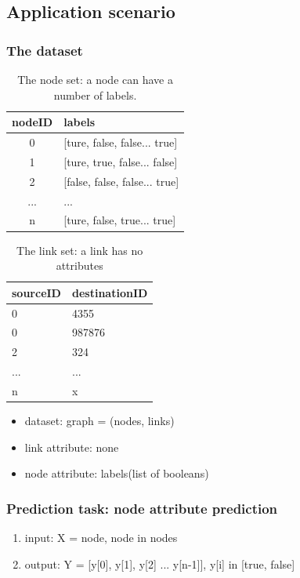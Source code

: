 \documentclass{article}
\begin{document}
\subsection{Application scenario}

\subsubsection{The dataset}
\begin{table}[H]
	\centering
	\begin{tabularx}{0.5\textwidth}{|c|X| }  \hline
		nodeID & labels \\ \hline
		0 & [ture, false, false... true] \\ \hline
		1 & [ture, true, false... false] \\ \hline
		2 & [false, false, false... true] \\ \hline
		... & ... \\ \hline
		n & [ture, false, true... true] \\ \hline
	\end{tabularx}
	\caption{The node set: a node can have a number of labels.}
\end{table}
\begin{table}[H]
	\centering
	\begin{tabularx}{0.5\textwidth}{|X|X|}  \hline
		sourceID & destinationID \\ \hline
		0 & 4355 \\ \hline
		0 & 987876 \\ \hline
		2 & 324 \\ \hline
		... & ... \\ \hline
		n & x \\ \hline
	\end{tabularx}
	\caption{The link set: a link has no attributes}
\end{table}
\begin{itemize}
	\item dataset: graph = (nodes, links)
	\item link attribute: none
	\item node attribute: labels(list of booleans)
\end{itemize}

\subsubsection{Prediction task: node attribute prediction}
\begin{enumerate}
	\item input: X = node, node in nodes
	\item output: Y = [y[0], y[1], y[2] ... y[n-1]], y[i] in [true, false]
\end{enumerate}
\end{document}
